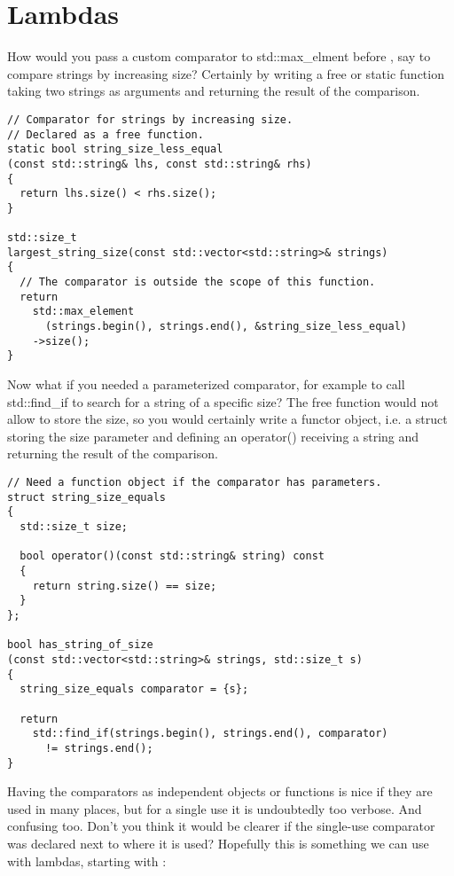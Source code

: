 \section{Lambdas}

How would you pass a custom comparator to std::max\_elment before
, say to compare strings by increasing size? Certainly by
writing a free or static function taking two strings as arguments and
returning the result of the comparison.

\begin{lstlisting}
// Comparator for strings by increasing size.
// Declared as a free function.
static bool string_size_less_equal
(const std::string& lhs, const std::string& rhs)
{
  return lhs.size() < rhs.size();
}

std::size_t
largest_string_size(const std::vector<std::string>& strings)
{
  // The comparator is outside the scope of this function.
  return
    std::max_element
      (strings.begin(), strings.end(), &string_size_less_equal)
    ->size();
}
\end{lstlisting}

Now what if you needed a parameterized comparator, for example to call
std::find\_if to search for a string of a specific size? The free
function would not allow to store the size, so you would certainly
write a functor object, i.e. a struct storing the size parameter and
defining an operator() receiving a string and returning the result of
the comparison.

\begin{lstlisting}
// Need a function object if the comparator has parameters.
struct string_size_equals
{
  std::size_t size;
    
  bool operator()(const std::string& string) const
  {
    return string.size() == size;
  }
};
  
bool has_string_of_size
(const std::vector<std::string>& strings, std::size_t s)
{
  string_size_equals comparator = {s};

  return
    std::find_if(strings.begin(), strings.end(), comparator)
      != strings.end();
}
\end{lstlisting}

Having the comparators as independent objects or functions is nice if
they are used in many places, but for a single use it is undoubtedly
too verbose. And confusing too. Don't you think it would be clearer if
the single-use comparator was declared next to where it is used?
Hopefully this is something we can use with lambdas, starting with
:

